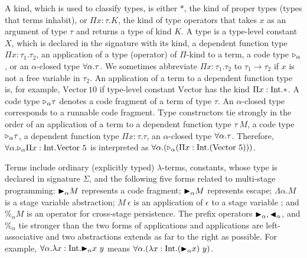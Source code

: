


A kind, which is used to classify types, is either $*$, the kind of
proper types (types that terms inhabit), or $\Pi x\colon\tau.K$, the kind
of type operators that takes $x$ as an argument of type $\tau$ and returns a type
of kind $K$.
A type is a type-level constant $X$, which is declared in the signature with its kind, a dependent function type $\Pi x:\tau_1.\tau_2$,
an application of a type (operator) of $\Pi$-kind to a term, a code type ${\mathop{\triangleright}}_\alpha$, or an $\alpha$-closed type $\forall\alpha.\tau$.
We sometimes abbreviate $\Pi x:\tau_1.\tau_2$ to $\tau_1 \rightarrow \tau_2$ if
$x$ is not a free variable in $\tau_2$. 
An application of a term to a dependent function type  is, for example, $\text{Vector}\ 10$
if type-level constant $\text{Vector}$ has the kind $\Pi x:\textrm{Int}.*$.
A code type ${\mathop{\triangleright}}_\alpha \tau$ denotes a code fragment of a term of type $\tau$.
An $\alpha$-closed type corresponds to a runnable code fragment.
Type constructors tie strongly  in the order of 
an application of a term to a dependent function type $\tau\ M$,
a code type ${\mathop{\triangleright}}_{\alpha} \tau$,
a dependent function type $\Pi x:\tau.\tau$, 
an $\alpha$-closed type $\forall\alpha.\tau$.
Therefore, $\F\alpha.\TW_{\alpha} \Pi x:\I.\text{Vector}\ 5$ is interpreted as
$\F\alpha.(\TW_{\alpha} (\Pi x:\I.(\text{Vector}\ 5)))$. 


Terms include ordinary (explicitly typed) \(\lambda\)-terms, constants,
whose type is declared in signature $\Sigma$, and the following five forms
related to multi-stage programming:
${\mathop{\blacktriangleright}}_\alpha M$ represents a code fragment; ${\mathop{\blacktriangleright}}_\alpha M$ represents escape;
$\Lambda\alpha.M$ is a stage variable abstraction;
$M\ \epsilon$ is an application of $\epsilon$ to a stage variable ; and 
$\%_\alpha M$ is an operator for cross-stage persistence.
The prefix operators ${\mathop{\blacktriangleright}}_\alpha, {\mathop{\blacktriangleleft}}_\alpha$, and $\%_\alpha$ tie stronger than the two forms of applications
and applications are left-associative
and two abstractions extends as far to the right as possible.
For example, $\forall\alpha.\lambda x:\textrm{Int}.{\mathop{\blacktriangleright}}_\alpha x\ y$ means $\F\alpha.(\lambda x:\I.(\TB_\alpha x)\ y)$.

